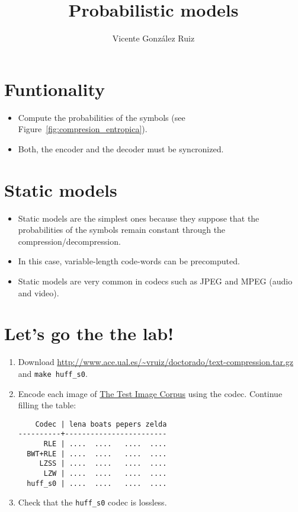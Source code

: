 \title{Probabilistic models}
\author{Vicente González Ruiz}
\maketitle
\tableofcontents

\section{Funtionality}
\begin{itemize}
\item Compute the probabilities of the symbols (see
  Figure~\ref{fig:compresion_entropica}).
\item Both, the encoder and the decoder must be syncronized.
\end{itemize}

\section{Static models}
\begin{itemize}
\item Static models are the simplest ones because they suppose that
  the probabilities of the symbols remain constant through the
  compression/decompression.
\item In this case, variable-length code-words can be precomputed.
\item Static models are very common in codecs such
  as JPEG and MPEG (audio and video).
\end{itemize}

\section*{Let's go the the lab!}
\begin{enumerate}
\item Download
  \url{http://www.ace.ual.es/~vruiz/doctorado/text-compression.tar.gz}
  and \texttt{make huff\_s0}.
\item Encode each image of
  \href{http://www.ace.ual.es/~vruiz/images/}{The Test Image
    Corpus} using the  codec. Continue filling the table:
\begin{verbatim}
    Codec | lena boats pepers zelda
----------+------------------------
      RLE | ....  ....   ....  ....
  BWT+RLE | ....  ....   ....  ....
     LZSS | ....  ....   ....  ....
      LZW | ....  ....   ....  ....
  huff_s0 | ....  ....   ....  ....
\end{verbatim}
\item Check that the \texttt{huff\_s0} codec is lossless.
\end{enumerate}

